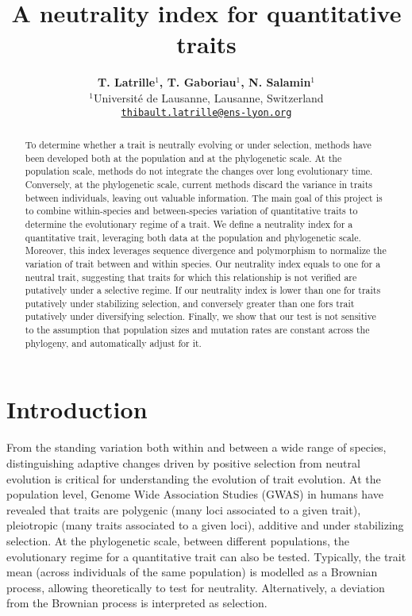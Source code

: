 \documentclass{article}
\title{A neutrality index for quantitative traits}
\author{
\large
\textbf{T. {Latrille}$^{1}$, T. {Gaboriau}$^{1}$, N. {Salamin}$^{1}$}\\
\normalsize
$^{1}$Université de Lausanne, Lausanne, Switzerland\\
\texttt{\href{mailto:thibault.latrille@ens-lyon.org}{thibault.latrille@ens-lyon.org}} \\
}
\begin{document}
\maketitle

\begin{abstract}
    To determine whether a trait is neutrally evolving or under selection, methods have been developed both at the population and at the phylogenetic scale.
    At the population scale, methods do not integrate the changes over long evolutionary time.
    Conversely, at the phylogenetic scale, current methods discard the variance in traits between individuals, leaving out valuable information.
    The main goal of this project is to combine within-species and between-species variation of quantitative traits to determine the evolutionary regime of a trait.
    We define a neutrality index for a quantitative trait, leveraging both data at the population and phylogenetic scale.
    Moreover, this index leverages sequence divergence and polymorphism to normalize the variation of trait between and within species.
    Our neutrality index equals to one for a neutral trait, suggesting that traits for which this relationship is not verified are putatively under a selective regime.
    If our neutrality index is lower than one for traits putatively under stabilizing selection, and conversely greater than one fors trait putatively under diversifying selection.
    Finally, we show that our test is not sensitive to the assumption that population sizes and mutation rates are constant across the phylogeny, and automatically adjust for it.
\end{abstract}


\section{Introduction}\label{sec:introduction}

From the standing variation both within and between a wide range of species, distinguishing adaptive changes driven by positive selection from neutral evolution is critical for understanding the evolution of trait evolution.
At the population level, Genome Wide Association Studies (GWAS) in humans have revealed that traits are polygenic (many loci associated to a given trait), pleiotropic (many traits associated to a given loci), additive and under stabilizing selection\cite{simons_population_2018, sella_thinking_2019}.
At the phylogenetic scale, between different populations, the evolutionary regime for a quantitative trait can also be tested.
Typically, the trait mean (across individuals of the same population) is modelled as a Brownian process, allowing theoretically to test for neutrality.
Alternatively, a deviation from the Brownian process is interpreted as selection\cite{catalan_drift_2019}.
\end{document}
